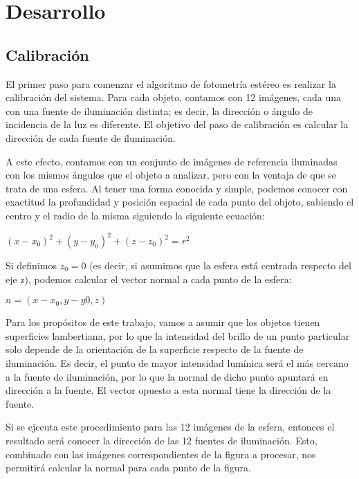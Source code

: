 \section{Desarrollo}

\subsection{Calibración}

El primer paso para comenzar el algoritmo de fotometría estéreo es realizar
la calibración del sistema. Para cada objeto, contamos con 12 imágenes,
cada una con una fuente de iluminación distinta; es decir, la dirección o
ángulo de incidencia de la luz es diferente. El objetivo del paso de calibración
es calcular la dirección de cada fuente de iluminación.

A este efecto, contamos con un conjunto de imágenes de referencia iluminadas
con los mismos ángulos que el objeto a analizar, pero con la ventaja de que se
trata de una esfera. Al tener una forma conocida y simple, podemos conocer con
exactitud la profundidad y posición espacial de cada punto del objeto,
sabiendo el centro y el radio de la misma siguiendo la siguiente ecuación:

\begin{center}
$(x - x_0)^2 + (y - y_0)^2 + (z - z_0)^2 = r^2$
\end{center}

Si definimos $z_0 = 0$ (es decir, si asumimos que la esfera está centrada
respecto del eje z), podemos calcular el vector normal a cada punto de la esfera:

\begin{center}
$n = (x - x_0, y - y0, z)$
\end{center}

Para los propósitos de este trabajo, vamos a asumir que los objetos tienen
superficies lambertiana, por lo que la intensidad del brillo de un punto
particular solo depende de la orientación de la superficie respecto de la
fuente de iluminación. Es decir, el punto de mayor intensidad lumínica
será el más cercano a la fuente de iluminación, por lo que la normal
de dicho punto apuntará en dirección a la fuente. El vector opuesto a esta
normal tiene la dirección de la fuente.

Si se ejecuta este procedimiento para las 12 imágenes de la esfera, entonces
el resultado será conocer la dirección de las 12 fuentes de iluminación. Esto,
combinado con las imágenes correspondientes de la figura a procesar,
nos permitirá calcular la normal para cada punto de la figura.

